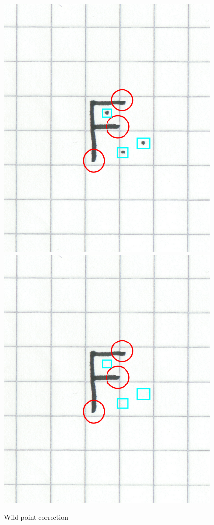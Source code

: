  \begin{figure}[htbp]
   \begin{center}
 \includegraphics[scale=1.5]{images/F3afterDehookingBeforeWildPointCorrection.png}
 \includegraphics[scale=1.5]{images/F4afterDehookingAndAfterWildPointCorrection.png}
 \caption{Wild point correction}
 \label{fig:wildpointcorrection}
   \end{center}
 \end{figure}

